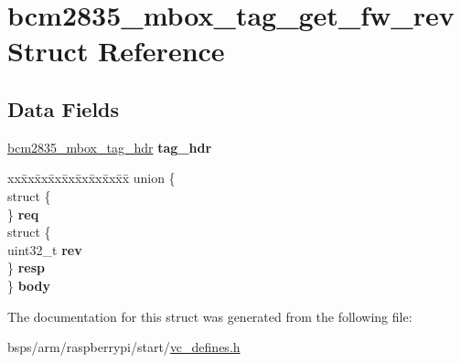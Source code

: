 \hypertarget{structbcm2835__mbox__tag__get__fw__rev}{}\section{bcm2835\+\_\+mbox\+\_\+tag\+\_\+get\+\_\+fw\+\_\+rev Struct Reference}
\label{structbcm2835__mbox__tag__get__fw__rev}
\subsection*{Data Fields}
\begin{DoxyCompactItemize}
\item 
\mbox{\label{structbcm2835__mbox__tag__get__fw__rev_af5b0a1579078a25e0b89af038c9e1c94}} 
\mbox{\hyperlink{structbcm2835__mbox__tag__hdr}{bcm2835\+\_\+mbox\+\_\+tag\+\_\+hdr}} {\bfseries tag\+\_\+hdr}
\item 
\mbox{\label{structbcm2835__mbox__tag__get__fw__rev_a931d67d9db884340ed2b752fe0ccc2ac}} 
\begin{tabbing}
xx\=xx\=xx\=xx\=xx\=xx\=xx\=xx\=xx\=\kill
union \{\\
\>struct \{\\
\>\} {\bfseries req}\\
\>struct \{\\
\>\>uint32\_t {\bfseries rev}\\
\>\} {\bfseries resp}\\
\} {\bfseries body}\\

\end{tabbing}\end{DoxyCompactItemize}


The documentation for this struct was generated from the following file\+:\begin{DoxyCompactItemize}
\item 
bsps/arm/raspberrypi/start/\mbox{\hyperlink{vc__defines_8h}{vc\+\_\+defines.\+h}}\end{DoxyCompactItemize}
